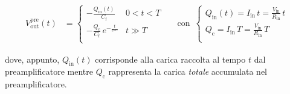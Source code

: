 \documentclass[a4paper,11pt]{article} %
\begin{document}
\begin{align}\label{e:preamp_vout} 
	V^{\text{pre}}_{\text{out}}(t) &= \begin{cases} -\frac{ Q_{\text{in}}
	(t)}{C_{\text{f}} } & 0 < t < T \\
        -\frac{ Q_{\text{c}} }{ C_{\text{f}} } \, e^{ -\frac{ t }{ \tau^{\text{pre}} } } & t \gg T \\
    \end{cases}
    & 
    &\text{con} \,\,\, 
    \begin{cases} 
        Q_{\text{in}} (t) = I_{\text{in}}\,t = \frac{ V_{\text{in}} }{ R_{\text{in}} }\,t \\
        Q_{\text{c}} = I_{\text{in}}\,T = \frac{ V_{\text{in}} }{ R_{\text{in}} }\,T \\
    \end{cases}
\end{align} 

dove, appunto, $Q_{\text{in}} (t)$ corrisponde alla carica raccolta al tempo $t$ dal preamplificatore mentre
$Q_{\text{c}}$ rappresenta la carica \textit{totale} accumulata nel preamplificatore. 










\end{document}
